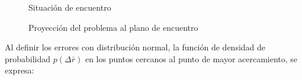 \begin{figure}[!h]
\begin{minipage}[t]{0.48\textwidth}
 \centering
 \caption[El planteo general de la PoC]{Situaci\'on de encuentro  \citep{alfano2007review}}
 \label{fig:pocproblema}
\end{minipage}
\begin{minipage}[t]{0.48\textwidth}
 \centering
 \caption[El plano de encuentro]{Proyecci\'on del problema al plano de encuentro \citep{alfano2007review}}
 \label{fig:poc2d}
\end{minipage}
\end{figure}

Al definir los errores con distribuci\'on normal, la funci\'on de densidad de probabilidad $p(\Delta \bar{r})$ en los puntos cercanos al punto de mayor acercamiento, se expresa:\\

